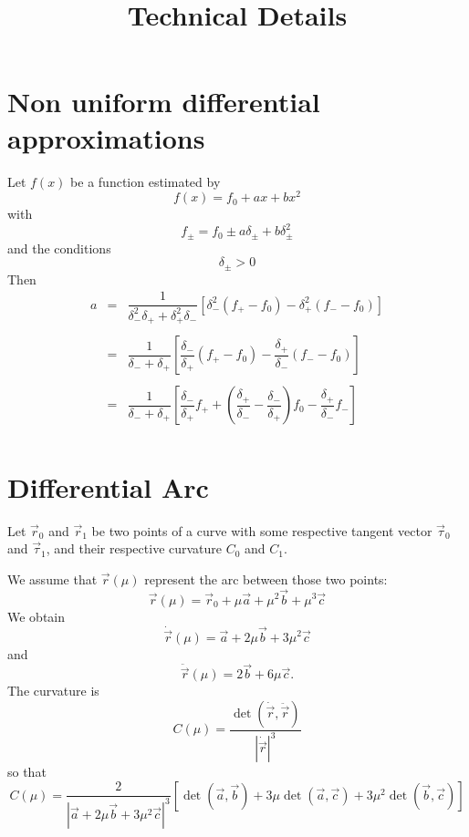 \documentclass[11pt]{amsart}
\title{Technical Details}
\begin{document}
\maketitle

\section{Non uniform differential approximations}

Let $f(x)$ be a function estimated by
\[
	f(x) = f_0 + ax + b x^2
\]
with
\[
	f_\pm = f_0 \pm a \delta_\pm + b \delta_\pm^2
\]
and the conditions
\[
	\delta_\pm > 0 %
\]
Then
\[
\begin{array}{rcl}
	a & = &
	\dfrac{1}{\delta_-^2\delta_+ + \delta_+^2\delta_-}
	\left[ 
	   \delta_-^2\left(f_+ - f_0 \right)
	 - \delta_+^2\left(f_- - f_0 \right)
	\right] \\
	\\
	& = & \dfrac{1}{\delta_- + \delta_+} 
	\left[
	 \dfrac{\delta_-}{\delta_+} \left(f_+ - f_0 \right)
	-\dfrac{\delta_+}{\delta_-} \left(f_- - f_0 \right)
	\right] \\
	\\
	& = & \dfrac{1}{\delta_- + \delta_+} 
	\left[
	\dfrac{\delta_-}{\delta_+} f_+
	+\left(\dfrac{\delta_+}{\delta_-} - \dfrac{\delta_-}{\delta_+}\right) f_0
	-\dfrac{\delta_+}{\delta_-} f_-
	\right]\\
\end{array}
\]

\section{Differential Arc}
Let $\vec{r}_0$ and $\vec{r}_1$ be two points of a curve
with some respective tangent vector $\vec{\tau}_0$ and $\vec{\tau}_1$, and their
respective curvature $C_0$ and $C_1$.

We assume that $\vec{r}(\mu)$ represent the arc between those two points:
\[
	\vec{r}(\mu) = \vec{r}_0 + \mu \vec{a} + \mu^2 \vec{b} + \mu^3 \vec{c}
\]
We obtain
\[
	\dot{\vec{r}}(\mu) = \vec{a} + 2 \mu \vec{b} + 3 \mu^2 \vec{c}
\]
and
\[
	\ddot{\vec{r}}(\mu) = 2\vec{b} + 6 \mu \vec{c}.
\]
The curvature is
\[
	C(\mu) = \dfrac{\det\left(\dot{\vec{r}},\ddot{\vec{r}}\right)}{\left|\dot{\vec{r}}\right|^3}
\]
so that
\[
	C(\mu) = \dfrac{2}{\left|\vec{a} + 2 \mu \vec{b} + 3 \mu^2 \vec{c}\right|^3}
	\left[
	\det\left(\vec{a},\vec{b}\right)
	+3\mu\det\left(\vec{a},\vec{c}\right)
	+3\mu^2\det\left(\vec{b},\vec{c}\right)
	\right]
\]
\end{document}
